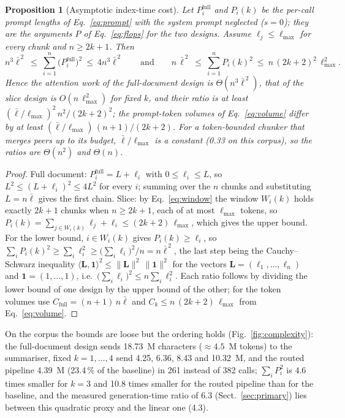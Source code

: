 \documentclass[pdflatex,sn-mathphys-num]{sn-jnl}
\theoremstyle{thmstyleone}%
\newtheorem{proposition}[theorem]{Proposition}%
\theoremstyle{thmstylethree}%
\begin{document}
\begin{proposition}[Asymptotic index-time cost]\label{prop:complexity}
Let $P_i^{\mathrm{full}}$ and $P_i(k)$ be the per-call prompt lengths of Eq.~\eqref{eq:prompt} with the system prompt neglected ($s=0$); they are the arguments $P$ of Eq.~\eqref{eq:flops} for the two designs. Assume $\ell_j\le\ell_{\max}$ for every chunk and $n\ge 2k+1$. Then
\begin{equation*}
n^{3}\bar\ell^{\,2}\ \le\ \sum_{i=1}^{n}\bigl(P_i^{\mathrm{full}}\bigr)^{2}\ \le\ 4n^{3}\bar\ell^{\,2}
\qquad\text{and}\qquad
n\,\bar\ell^{\,2}\ \le\ \sum_{i=1}^{n}P_i(k)^{2}\ \le\ n\,(2k+2)^{2}\,\ell_{\max}^{2}.
\end{equation*}
Hence the attention work of the full-document design is $\Theta(n^{3}\bar\ell^{\,2})$, that of the slice design is $O(n\,\ell_{\max}^{2})$ for fixed $k$, and their ratio is at least $(\bar\ell/\ell_{\max})^{2}\,n^{2}/(2k+2)^{2}$; the prompt-token volumes of Eq.~\eqref{eq:volume} differ by at least $(\bar\ell/\ell_{\max})\,(n+1)/(2k+2)$. For a token-bounded chunker that merges peers up to its budget, $\bar\ell/\ell_{\max}$ is a constant (0.33 on this corpus), so the ratios are $\Theta(n^{2})$ and $\Theta(n)$.
\end{proposition}
\begin{proof}
Full document: $P_i^{\mathrm{full}}=L+\ell_i$ with $0\le\ell_i\le L$, so $L^{2}\le(L+\ell_i)^{2}\le 4L^{2}$ for every $i$; summing over the $n$ chunks and substituting $L=n\bar\ell$ gives the first chain. Slice: by Eq.~\eqref{eq:window} the window $W_i(k)$ holds exactly $2k+1$ chunks when $n\ge 2k+1$, each of at most $\ell_{\max}$ tokens, so $P_i(k)=\sum_{j\in W_i(k)}\ell_j+\ell_i\le(2k+2)\,\ell_{\max}$, which gives the upper bound. For the lower bound, $i\in W_i(k)$ gives $P_i(k)\ge\ell_i$, so $\sum_i P_i(k)^{2}\ge\sum_i\ell_i^{2}\ge\bigl(\sum_i\ell_i\bigr)^{2}/n=n\bar\ell^{\,2}$, the last step being the Cauchy--Schwarz inequality $\langle\mathbf L,\mathbf 1\rangle^{2}\le\lVert\mathbf L\rVert^{2}\,\lVert\mathbf 1\rVert^{2}$ for the vectors $\mathbf L=(\ell_1,\dots,\ell_n)$ and $\mathbf 1=(1,\dots,1)$, i.e.\ $\bigl(\sum_i\ell_i\bigr)^{2}\le n\sum_i\ell_i^{2}$. Each ratio follows by dividing the lower bound of one design by the upper bound of the other; for the token volumes use $C_{\mathrm{full}}=(n+1)\,n\bar\ell$ and $C_k\le n\,(2k+2)\,\ell_{\max}$ from Eq.~\eqref{eq:volume}.
\end{proof}

On the corpus the bounds are loose but the ordering holds (Fig.~\ref{fig:complexity}): the full-document design sends 18.73\, M characters ($\approx 4.5$\, M tokens) to the summariser, fixed $k=1,\dots,4$ send 4.25, 6.36, 8.43 and 10.32\, M, and the routed pipeline 4.39\, M (23.4\,\% of the baseline) in 261 instead of 382 calls; $\sum_i P_i^2$ is 4.6 times smaller for $k=3$ and 10.8 times smaller for the routed pipeline than for the baseline, and the measured generation-time ratio of 6.3 (Sect.~\ref{sec:primary}) lies between this quadratic proxy and the linear one (4.3).
\end{document}
